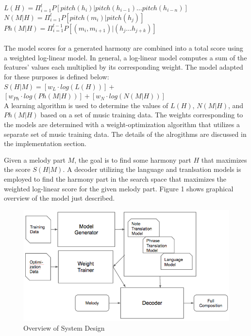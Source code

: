 \documentclass{sig-alternate}
\begin{document}
$L(H) = \Pi_{i = 1}^{l} P[pitch(h_{i}) | pitch(h_{i - 1}) \ldots pitch(h_{i - n})]$\\

$N(M | H) = \Pi_{i = 1}^{l} P[pitch(m_{i}) | pitch(h_{j})]$\\

$Ph(M | H) = \Pi_{i = 1}^{l - 1} P[(m_{i}, m_{i + 1}) | (h_{j} \ldots h_{j + k})]$\\
\\

The model scores for a generated harmony are combined into a total score using a weighted log-linear model. In general, a log-linear model computes a sum of the features' values each multiplied by its corresponding weight. The model adapted for these purposes is defined below:\\

$S(H | M) = [w_{L}\cdot log(L(H))] + $\\

$[w_{Ph}\cdot log(Ph(M | H))] + [w_{N}\cdot log(N(M | H))]$\\

A learning algorithm is used to determine the values of $L(H)$, $N(M | H)$, and $Ph(M | H)$ based on a set of music training data. The weights corresponding to the models are determined with a weight-optimization algorithm that utilizes a separate set of music training data. The details of the alrogithms are discussed in the implementation section.

Given a melody part $M$, the goal is to find some harmony part $H$ that maximizes the score $S(H | M)$.
A decoder utilizing  the language and tranlsation models is employed to find the harmony part in the search space that maximizes the weighted log-linear score for the given melody part. Figure 1 shows graphical overview of the model just described.
\begin{figure}
\includegraphics[scale=0.3]{system_design.png}
\caption{Overview of System Design}
\end{figure}
\end{document}

